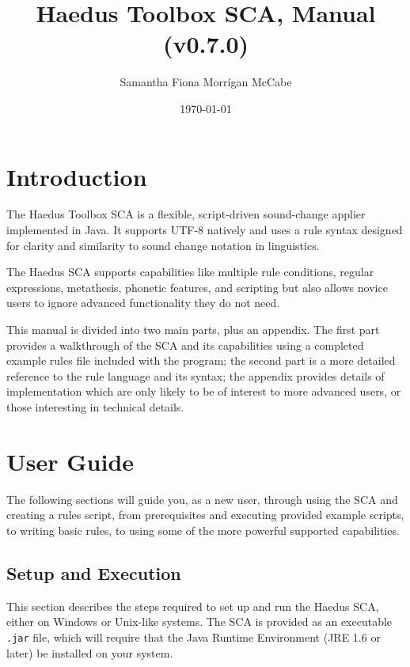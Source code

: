 \documentclass[10pt,letterpaper]{article}
\title{Haedus Toolbox SCA, Manual (v0.7.0)}
\author{Samantha Fiona Morrígan McCabe}
\date{\today}
\begin{document}
\maketitle
\tableofcontents

\section*{Introduction} 
\label{sec:introduction}
The Haedus Toolbox SCA is a flexible, script-driven sound-change applier implemented in Java. It supports UTF-8 natively and uses a rule syntax designed for clarity and similarity to sound change notation in linguistics.

The Haedus SCA supports capabilities like multiple rule conditions, regular expressions, metathesis, phonetic features, and scripting but also allows novice users to ignore advanced functionality they do not need.

This manual is divided into two main parts, plus an appendix. The first part provides a walkthrough of the SCA and its capabilities using a completed example rules file included with the program; the second part is a more detailed reference to the rule language and its syntax; the appendix provides details of implementation which are only likely to be of interest to more advanced users, or those interesting in technical details.


\section{User Guide} 
\label{sec:user_guide}
The following sections will guide you, as a new user, through using the SCA and creating a rules script, from prerequisites and executing provided example scripts, to writing basic rules, to using some of the more powerful supported capabilities.


\subsection{Setup and Execution}
\label{sub:setup_and_execution}
This section describes the steps required to set up and run the Haedus SCA, either on Windows or Unix-like systems. The SCA is provided as an executable \texttt{.jar} file, which will require that the Java Runtime Environment (JRE 1.6 or later) be installed on your system.
\end{document}
